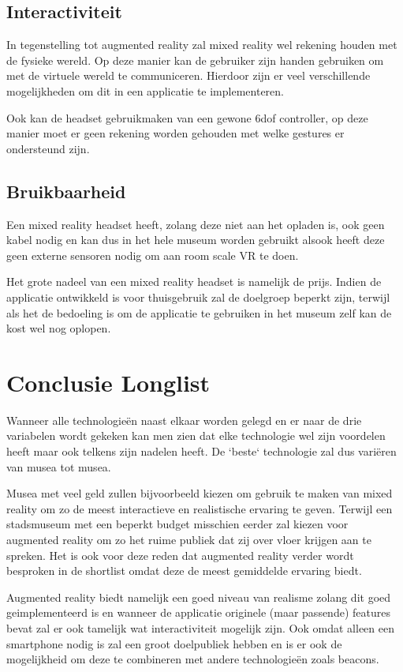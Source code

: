 \subsection{Interactiviteit}
In tegenstelling tot augmented reality zal mixed reality wel rekening houden met de fysieke wereld. Op deze manier kan de gebruiker zijn handen gebruiken om met de virtuele wereld te communiceren. Hierdoor zijn er veel verschillende mogelijkheden om dit in een applicatie te implementeren.

Ook kan de headset gebruikmaken van een gewone \acrshort{6dof} controller, op deze manier moet er geen rekening worden gehouden met welke gestures er ondersteund zijn.

\subsection{Bruikbaarheid}
Een mixed reality headset heeft, zolang deze niet aan het opladen is, ook geen kabel nodig en kan dus in het hele museum worden gebruikt alsook heeft deze geen externe sensoren nodig om aan room scale VR te doen. 

Het grote nadeel van een mixed reality headset is namelijk de prijs. Indien de applicatie ontwikkeld is voor thuisgebruik zal de doelgroep beperkt zijn, terwijl als het de bedoeling is om de applicatie te gebruiken in het museum zelf kan de kost wel nog oplopen.


\section{Conclusie Longlist}
Wanneer alle technologieën naast elkaar worden gelegd en er naar de drie variabelen wordt gekeken kan men zien dat elke technologie wel zijn voordelen heeft maar ook telkens zijn nadelen heeft. De `beste` technologie zal dus variëren van musea tot musea. 

Musea met veel geld zullen bijvoorbeeld kiezen om gebruik te maken van mixed reality om zo de meest interactieve en realistische ervaring te geven. Terwijl een stadsmuseum met een beperkt budget misschien eerder zal kiezen voor augmented reality om zo het ruime publiek dat zij over vloer krijgen aan te spreken. Het is ook voor deze reden dat augmented reality verder wordt besproken in de shortlist omdat deze de meest gemiddelde ervaring biedt.

Augmented reality biedt namelijk een goed niveau van realisme zolang dit goed geimplementeerd is en wanneer de applicatie originele (maar passende) features bevat zal er ook tamelijk wat interactiviteit mogelijk zijn. Ook omdat alleen een smartphone nodig is zal een groot doelpubliek hebben en is er ook de mogelijkheid om deze te combineren met andere technologieën zoals beacons.